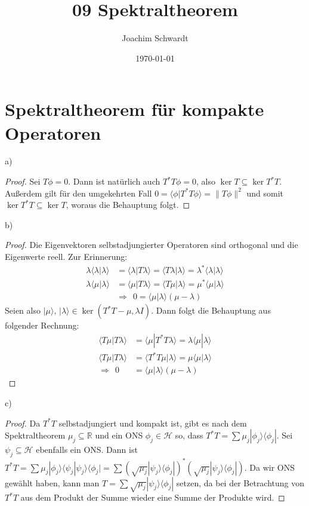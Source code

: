 \documentclass[a4paper,12pt]{article}
\newcommand{\brak}{}
\newcommand{\kla}{}
\newcommand{\oper}{}
\newcommand{\Ket}{}
\begin{document}
\title{09 Spektraltheorem}
\author{Joachim Schwardt}
\date{\today}
\maketitle

\section{Spektraltheorem für kompakte Operatoren}
a)
\begin{proof}
Sei $T\phi=0$. Dann ist natürlich auch $T^\ast T\phi=0$, also $\ker T\subseteq\ker T^\ast T$. Außerdem gilt für den umgekehrten Fall $0=\brak\langle {\phi}| {T^\ast T\phi}\rangle=\|T\phi\|^2$ und somit $\ker T^\ast T\subseteq\ker T$, woraus die Behauptung folgt.
\end{proof}
b)
\begin{proof}
Die Eigenvektoren selbstadjungierter Operatoren sind orthogonal und die Eigenwerte reell. Zur Erinnerung: 
\begin{align*}
\lambda\brak\langle {\lambda}| {\lambda}\rangle&=\brak\langle {\lambda}| {T\lambda}\rangle=\brak\langle {T\lambda}| {\lambda}\rangle=\lambda^\ast\brak\langle {\lambda}| {\lambda}\rangle\\
\lambda\brak\langle {\mu}| {\lambda }\rangle&=\brak\langle {\mu }| {T\lambda}\rangle=\brak\langle {T\mu }| {\lambda}\rangle=\mu^\ast\brak\langle {\mu }| {\lambda}\rangle\\
&\Rightarrow\ \ 0=\brak\langle {\mu }| {\lambda}\rangle(\mu-\lambda)
\end{align*}
Seien also $\Ket | {\mu } \rangle,\,\Ket | {\lambda} \rangle\in\ker\kla\left( {T^\ast T-\mu,\lambda I} \right)$. Dann folgt die Behauptung aus folgender Rechnung:
\begin{align*}
\brak\langle {T\mu }| {T\lambda}\rangle&=\brak\langle {\mu }| {T^\ast T\lambda}\rangle=\lambda\brak\langle {\mu }| {\lambda}\rangle\\
\brak\langle {T\mu }| {T\lambda}\rangle&=\brak\langle {T^\ast T\mu }| {\lambda}\rangle=\mu\brak\langle {\mu }| {\lambda}\rangle\\
\Rightarrow\ \ 0&=\brak\langle {\mu }| {\lambda}\rangle\kla\left( {\mu-\lambda} \right)
\end{align*}
\end{proof}
c)
\begin{proof}
Da $T^\ast T$ selbstadjungiert und kompakt ist, gibt es nach dem Spektraltheorem $\mu_j\subseteq\mathbb{R}$ und ein ONS $\phi_j \in\mathcal{H}$ so, dass $T^\ast T=\sum\mu_j\oper | {\phi_j} \rangle\langle {\phi_j} |$. Sei $\psi_j\subseteq\mathcal{H}$ ebenfalls ein ONS. Dann ist $T^\ast T=\sum\mu_j\oper | {\phi_j} \rangle\langle {\psi_j} \oper | {\psi_j} \rangle\langle {\phi_j} |=\sum\kla\left( {\sqrt{\mu_j}\oper | {\psi_j} \rangle\langle {\phi_j} |} \right)^\ast\kla\left( {\sqrt{\mu_j}\oper | {\psi_j} \rangle\langle {\phi_j} |} \right)$. Da wir ONS gewählt haben, kann man $T=\sum\sqrt{\mu_j}\oper | {\psi_j} \rangle\langle {\phi_j} |$ setzen, da bei der Betrachtung von $T^\ast T$ aus dem Produkt der Summe wieder eine Summe der Produkte wird.
\end{proof}
\end{document}

